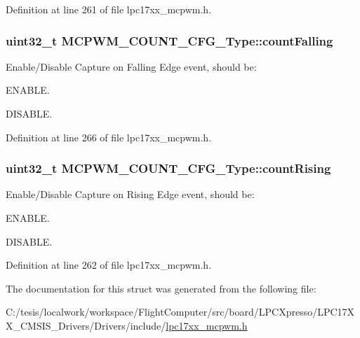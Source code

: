 \-Definition at line 261 of file lpc17xx\-\_\-mcpwm.\-h.

\hypertarget{struct_m_c_p_w_m___c_o_u_n_t___c_f_g___type_ab6d3905d27760a4985407df2b5795f56}{
\subsubsection[{count\-Falling}]{\setlength{\rightskip}{0pt plus 5cm}uint32\-\_\-t {\bf \-M\-C\-P\-W\-M\-\_\-\-C\-O\-U\-N\-T\-\_\-\-C\-F\-G\-\_\-\-Type\-::count\-Falling}}}\label{struct_m_c_p_w_m___c_o_u_n_t___c_f_g___type_ab6d3905d27760a4985407df2b5795f56}
\-Enable/\-Disable \-Capture on \-Falling \-Edge event, should be\-:
\begin{DoxyItemize}
\item \-E\-N\-A\-B\-L\-E.
\item \-D\-I\-S\-A\-B\-L\-E. 
\end{DoxyItemize}

\-Definition at line 266 of file lpc17xx\-\_\-mcpwm.\-h.

\hypertarget{struct_m_c_p_w_m___c_o_u_n_t___c_f_g___type_a687fbc466690659d363536f244a7f89a}{
\subsubsection[{count\-Rising}]{\setlength{\rightskip}{0pt plus 5cm}uint32\-\_\-t {\bf \-M\-C\-P\-W\-M\-\_\-\-C\-O\-U\-N\-T\-\_\-\-C\-F\-G\-\_\-\-Type\-::count\-Rising}}}\label{struct_m_c_p_w_m___c_o_u_n_t___c_f_g___type_a687fbc466690659d363536f244a7f89a}
\-Enable/\-Disable \-Capture on \-Rising \-Edge event, should be\-:
\begin{DoxyItemize}
\item \-E\-N\-A\-B\-L\-E.
\item \-D\-I\-S\-A\-B\-L\-E. 
\end{DoxyItemize}

\-Definition at line 262 of file lpc17xx\-\_\-mcpwm.\-h.



\-The documentation for this struct was generated from the following file\-:\begin{DoxyCompactItemize}
\item 
\-C\-:/tesis/localwork/workspace/\-Flight\-Computer/src/board/\-L\-P\-C\-Xpresso/\-L\-P\-C17\-X\-X\-\_\-\-C\-M\-S\-I\-S\-\_\-\-Drivers/\-Drivers/include/\hyperlink{lpc17xx__mcpwm_8h}{lpc17xx\-\_\-mcpwm.\-h}\end{DoxyCompactItemize}
